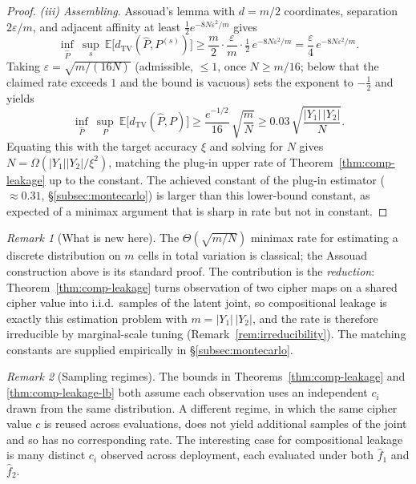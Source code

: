 \documentclass[11pt]{article}
\theoremstyle{definition}
\theoremstyle{plain}
\theoremstyle{remark}
\newtheorem{remark}{Remark}[section]
\newcommand{\fhat}{\hat{f}}
\newcommand{\TV}{d_{\mathrm{TV}}}
\begin{document}
\begin{proof}
\emph{(iii) Assembling.}  Assouad's lemma with $d = m/2$ coordinates,
separation $2\varepsilon/m$, and adjacent affinity at least
$\tfrac12 e^{-8N\varepsilon^2/m}$ gives
\[
\inf_{\hat P}\ \sup_{s}\ \mathbb{E}\bigl[\TV(\hat P, P^{(s)})\bigr]
  \geq \frac{m}{2}\cdot\frac{\varepsilon}{m}\cdot
       \tfrac12\, e^{-8N\varepsilon^2/m}
  = \frac{\varepsilon}{4}\, e^{-8N\varepsilon^2/m}.
\]
Taking $\varepsilon = \sqrt{m/(16N)}$ (admissible, $\le 1$, once
$N \geq m/16$; below that the claimed rate exceeds $1$ and the bound is
vacuous) sets the exponent to $-\tfrac12$ and yields
\[
\inf_{\hat P}\ \sup_{P}\ \mathbb{E}\bigl[\TV(\hat P, P)\bigr]
  \geq \frac{e^{-1/2}}{16}\,\sqrt{\frac{m}{N}}
  \geq 0.03\,\sqrt{\frac{|Y_1|\,|Y_2|}{N}}.
\]
Equating this with the target accuracy $\xi$ and solving for $N$ gives
$N = \Omega(|Y_1||Y_2|/\xi^2)$, matching the plug-in upper rate of
Theorem~\ref{thm:comp-leakage} up to the constant.  The achieved
constant of the plug-in estimator ($\approx 0.31$, \S\ref{subsec:montecarlo})
is larger than this lower-bound constant, as expected of a minimax
argument that is sharp in rate but not in constant.
\end{proof}

\begin{remark}[What is new here]
The $\Theta(\sqrt{m/N})$ minimax rate for estimating a discrete
distribution on $m$ cells in total variation is classical; the Assouad
construction above is its standard proof.  The contribution is the
\emph{reduction}: Theorem~\ref{thm:comp-leakage} turns observation of two
cipher maps on a shared cipher value into i.i.d.\ samples of the latent
joint, so compositional leakage is exactly this estimation problem with
$m = |Y_1|\,|Y_2|$, and the rate is therefore irreducible by
marginal-scale tuning (Remark~\ref{rem:irreducibility}).  The matching
constants are supplied empirically in \S\ref{subsec:montecarlo}.
\end{remark}

\begin{remark}[Sampling regimes]
The bounds in Theorems~\ref{thm:comp-leakage} and
\ref{thm:comp-leakage-lb} both assume each observation uses an
independent $c_i$ drawn from the same distribution.  A different
regime, in which the same cipher value $c$ is reused across
evaluations, does not yield additional samples of the joint and so has
no corresponding rate.  The interesting case for compositional leakage
is many distinct $c_i$ observed across deployment, each evaluated
under both $\fhat_1$ and $\fhat_2$.
\end{remark}
\end{document}
